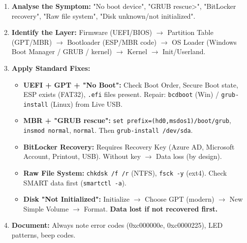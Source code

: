 \documentclass[11pt]{article}
\begin{document}
\begin{methode}
\begin{enumerate}
\item \textbf{Analyse the Symptom:} "No boot device", "GRUB rescue>", "BitLocker recovery", "Raw file system", "Disk unknown/not initialized".
\item \textbf{Identify the Layer:} Firmware (UEFI/BIOS) $\rightarrow$ Partition Table (GPT/MBR) $\rightarrow$ Bootloader (ESP/MBR code) $\rightarrow$ OS Loader (Windows Boot Manager / GRUB / kernel) $\rightarrow$ Kernel $\rightarrow$ Init/Userland.
\item \textbf{Apply Standard Fixes:}
\begin{itemize}
    \item \textbf{UEFI + GPT + "No Boot":} Check Boot Order, Secure Boot state, ESP exists (FAT32), \texttt{.efi} files present. Repair: \texttt{bcdboot} (Win) / \texttt{grub-install} (Linux) from Live USB.
    \item \textbf{MBR + "GRUB rescue":} \texttt{set prefix=(hd0,msdos1)/boot/grub}, \texttt{insmod normal}, \texttt{normal}. Then \texttt{grub-install /dev/sda}.
    \item \textbf{BitLocker Recovery:} Requires Recovery Key (Azure AD, Microsoft Account, Printout, USB). Without key $\rightarrow$ Data loss (by design).
    \item \textbf{Raw File System:} \texttt{chkdsk /f /r} (NTFS), \texttt{fsck -y} (ext4). Check SMART data first (\texttt{smartctl -a}).
    \item \textbf{Disk "Not Initialized":} Initialize $\rightarrow$ Choose GPT (modern) $\rightarrow$ New Simple Volume $\rightarrow$ Format. \textbf{Data lost if not recovered first.}
\end{itemize}
\item \textbf{Document:} Always note error codes (0xc000000e, 0xc0000225), LED patterns, beep codes.
\end{enumerate}
\end{methode}
\end{document}
